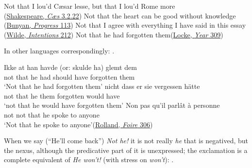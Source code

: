 \ea \label{ex:05-111}
\ea Not that I lou'd Cæsar lesse, but that I lou'd Rome more\\\hfill(\href{https://internetshakespeare.uvic.ca/doc/JC_F1/scene/3.2/index.html#tln-1550}{Shakespeare, \textit{Cæs} 3.2.22}) %
\ex Not that the heart can be good without knowledge\\\hfill(\href{https://archive.org/details/bunyanspilgrims00moffgoog/page/108/mode/2up?q=%22heart+can+be+good%22&view=theater}{Bunyan, \textit{Progress} 113})
\ex Not that I agree with everything I have said in this essay\\\hfill(\href{https://archive.org/details/intentions01wild/page/256/mode/2up?q=%22agree%22&view=theater}{Wilde, \textit{Intentions} 212})
\ex Not that he had forgotten them\hfill(\href{https://archive.org/details/wonderfulyear00lockuoft/page/326/mode/2up?q=%22not+that+he+had+forgotten%22&view=theater}{Locke, \textit{Year} 309})
\z
\z{}

In other languages correspondingly: .

\ea \label{ex:05-115}
\ea
\gll Ikke at han havde (or: skulde ha) glemt dem\\
 not that he had {} should have forgotten them\\
\glt `Not that he had forgotten them'
\ex
\gll nicht dass er sie vergessen hätte\\
 not that he them forgotten would have\\
\glt `not that he would have forgotten them'
\ex
\gll Non pas qu'il parlât à personne\\
 not not {that he} spoke to anyone\\
\glt `Not that he spoke to anyone'\hfill(\href{https://www.gutenberg.org/cache/epub/61876/pg61876-images.html}{Rolland, \textit{Foire} 306})
\z
\z
{}

When we say (``He'll come back'') \textit{Not he!} %
it is not really \textit{he} that is negatived, but the nexus, although the predicative part of it is unexpressed; the exclamation is a complete equivalent of \textit{He won't!} (with stress on \textit{won't}): .


